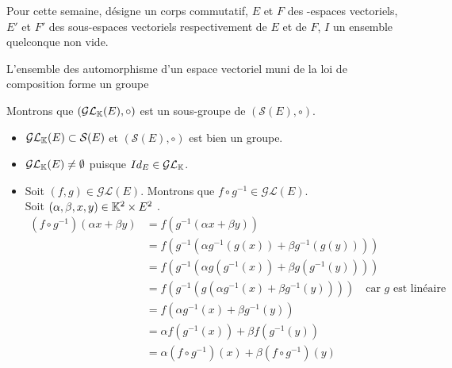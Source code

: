 \documentclass{article}
\date{31 Mars 2024}
\begin{document}
\maketitle

Pour cette semaine, \K désigne un corps commutatif, $E$ et $F$ des \K\!\!-espaces vectoriels, $E'$ et $F'$ des sous-espaces vectoriels respectivement de $E$ et de $F$, $I$ un ensemble quelconque non vide.

\begin{question_kholle}
	{L'ensemble des automorphisme d'un espace vectoriel muni de la loi de composition forme un groupe}

	Montrons que $(\mathcal{GL}_{\mathbb K}(E), \circ)$ est un sous-groupe de $(\mathcal{S}(E), \circ)$.
	\begin{itemize}
		\item $\mathcal{GL}_{\mathbb K}(E) \subset \mathcal{S}(E)$ et $(\mathcal{S}(E), \circ)$ est bien un groupe.
		\item $\mathcal{GL}_{\mathbb K}(E) \neq \emptyset$ puisque $Id_E \in \mathcal{GL}_{\mathbb K}$.
		\item Soit $(f, g) \in \mathcal{GL}(E)$. Montrons que $f \circ g^{-1} \in \mathcal{GL}(E)$. \\
		      Soit $(\alpha, \beta, x, y) \in \mathbb K^2 \times E^2$ \fqs. \\
		      \begin{equation*}
			      \begin{aligned}
				      \left(f \circ g^{-1}\right) \left(\alpha x + \beta y\right)
				       & = f \left( g^{-1} \left(\alpha x + \beta y\right) \right)                                                                             \\
				       & = f \left( g^{-1} \left(\alpha g^{-1}(g(x)) + \beta g^{-1}(g(y))\right) \right)                                                       \\
				       & = f \left( g^{-1} \left( \alpha g\left(g^{-1}(x)\right) + \beta g\left(g^{-1}(y)\right) \right) \right)                               \\
				       & = f \left( g^{-1} \left( g \left( \alpha g^{-1}(x) + \beta g^{-1}(y) \right) \right) \right) \quad \text{car } g \text{ est linéaire} \\
				       & = f \left( \alpha g^{-1}(x) + \beta g^{-1}(y) \right)                                                                                 \\
				       & = \alpha f \left( g^{-1}(x) \right) + \beta f \left( g^{-1}(y) \right)                                                                \\
				       & = \alpha \left(f \circ g^{-1}\right) (x) + \beta \left(f \circ g^{-1}\right) (y)
			      \end{aligned}
		      \end{equation*}
	\end{itemize}
\end{question_kholle}
\end{document}
